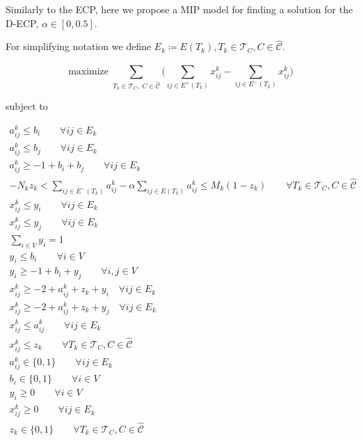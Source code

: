 Similarly to the \acrshort{ECP}, here we propose a \acrshort{MIP} model for
finding a solution for the \acrshort{D-ECP}, $\alpha \in [0, 0.5]$.

For simplifying notation we define $E_{k} \coloneqq E(T_{k}), T_{k} \in
	\mathcal{T}_{C}, C \in \mathcal{\hat{C}}$.

\begin{equation}
	\label{eq:d-ecp-objective}
	\text{maximize} \; \sum_{ T_{k} \in \mathcal{T}_{C}, \; C \in
		\mathcal{\hat{C}} } \big( \sum^{}_{ij \in E^{+} (T_{k})} x_{ij}
		^{k} - \sum_{ij \in E^{-} (T_{k})} x_{ij} ^{k} \big)
\end{equation} \begin{center} subject to \end{center}
\begin{gather}
	\label{eq:d-ecp-a-ij-l-bi}
	a_{ij}^{k} \leq b_{i} \quad\quad \forall ij \in E_k \\
	\label{eq:d-ecp-a-ij-l-bj}
	a_{ij}^{k} \leq b_{j} \quad\quad \forall ij \in E_k \\
	\label{eq:d-ecp-a-ij-g-ijk}
	a _{ij} ^{k} \geq - 1 + b_i + b_j \quad\quad \forall ij \in E_k \\
	\label{eq:d-ecp-alpha-constraint}
	-N_{k} z_k < \sum^{}_{ij \in E^{-} (T_k)} a_{ij}^{k}  - \alpha \sum^{}_{ij \in E(T_k)}
	a_{ij} ^{k}  \leq M_k (1 - z_k) \quad\quad \forall T_{k} \in \mathcal{T} _{C}, C \in
	\hat{\mathcal{C}} \\
	\label{eq:d-ecp-edge-charikar1}
	x _{ij}^{k}  \leq y_i \quad\quad \forall ij \in E_{k} \\
	\label{eq:d-ecp-edge-charikar2}
	x _{ij} ^{k} \leq y_j \quad\quad \forall ij \in E_k \\
	\label{eq:d-ecp-vertex-charikar1}
	\sum^{}_{i \in V} y_i = 1 \\
	\label{eq:d-ecp-vertex-l-b}
	y_i \leq b_i \quad\quad \forall i \in V \\
	\label{eq:d-ecp-vertex-g-bi-yj}
	y_i \geq -1 + b_i + y_j \quad\quad \forall i,j \in V \\
	\label{eq:d-ecp-x-l-sum1}
	x_{ij}^{k} \geq -2 + a_{ij} ^{k} + z_k + y_i \quad \forall ij \in E_k \\
	\label{eq:d-ecp-x-l-sum2}
	x_{ij}^{k} \geq -2 + a_{ij} ^{k} + z_k + y_j \quad \forall ij \in E_k \\
	\label{eq:d-ecp-x-l-a}
	x_{ij} ^{k} \leq a_{ij} ^{k} \quad\quad \forall ij \in E_k \\
	\label{eq:d-ecp-x-l-z}
	x_{ij} ^{k} \leq z_k \quad\quad \forall T_{k} \in \mathcal{T} _{C}, C \in
	\hat{\mathcal{C}}  \\
	\label{eq:d-ecp-a-ij}
	a _{ij} ^{k}  \in \{0, 1\} \quad\quad \forall ij \in E_k\\
	\label{eq:d-ecp-b-i}
	b _{i} \in \{0, 1\} \quad\quad \forall i \in V \\
	\label{eq:d-ecp-y-i}
	y _{i} \geq 0 \quad\quad \forall i \in V \\
	\label{eq:d-ecp-x-ij}
	x _{ij} ^{k}  \geq 0 \quad\quad \forall ij \in E_k\\
	\label{eq:d-ecp-z-k}
	z _{k} \in \{0, 1\} \quad\quad \forall T_{k} \in \mathcal{T} _{C}, C \in
	\hat{\mathcal{C}}
\end{gather}

